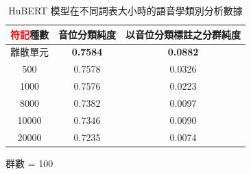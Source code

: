 {\begin{table}[!htbp]
            \begin{subtable}[t]{\textwidth}
                \centering
                \begin{tabular}{|c|c|c|} \hline
                    \textcolor{red}{符記}種數  & 音位分類純度    & 以音位分類標註之分群純度 \\ \hline
                    離散單元  & \textbf{0.7584} & \textbf{0.0882}          \\ \hline
                         500  &        0.7578   &         0.0326           \\ \hline
                        1000  &        0.7576   &         0.0223           \\ \hline
                        8000  &        0.7382   &         0.0097           \\ \hline
                       10000  &        0.7346   &         0.0090           \\ \hline
                       20000  &        0.7235   &         0.0074           \\ \hline
                \end{tabular}
                \caption{群數 = 100}
                \label{tab:ch4-new-hubert-pcls-clu100}
            \end{subtable}

            \caption{HuBERT 模型在不同詞表大小時的語音學類別分析數據}
            \label{tab:new--hubert-pcls-results}
        \end{table}
    }



